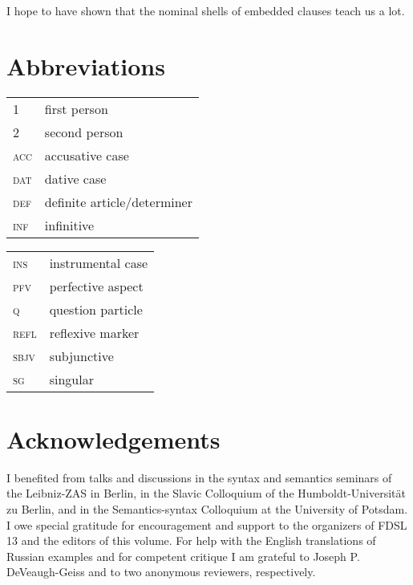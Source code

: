 \documentclass[output=paper,
colorlinks,
citecolor=brown,
newtxmath
]{langscibook}
\begin{document}
I hope to have shown that the nominal shells of embedded clauses teach us a lot.


\section*{Abbreviations}
\begin{tabularx}{.45\textwidth}{lQ}
\textsc{1} & first person\\
\textsc{2} & second person\\
\textsc{acc} & accusative case\\
\textsc{dat} & dative case\\
\textsc{def} & definite article/determiner\\
\textsc{inf} & infinitive\\
\end{tabularx}
\begin{tabularx}{.45\textwidth}{lQ}
\textsc{ins} & instrumental case\\
\textsc{pfv} & perfective aspect\\
\textsc{q} & question particle\\
\textsc{refl} & reflexive marker\\
\textsc{sbjv} & subjunctive\\
\textsc{sg} & singular\\
\end{tabularx}


\section*{Acknowledgements}
I benefited from talks and discussions in the syntax and semantics seminars of the Leibniz-ZAS in Berlin, in the Slavic Colloquium of the Humboldt-Universität zu Berlin, and in the Semantics-syntax Colloquium at the University of Potsdam. I owe special gratitude for encouragement and support to the organizers of FDSL 13 and the editors of this volume. For help with the English translations of Russian examples and for competent critique I am grateful to Joseph P. DeVeaugh-Geiss and to two anonymous reviewers, respectively.


\sloppy
\printbibliography[heading=subbibliography,notkeyword=this]
\end{document}
